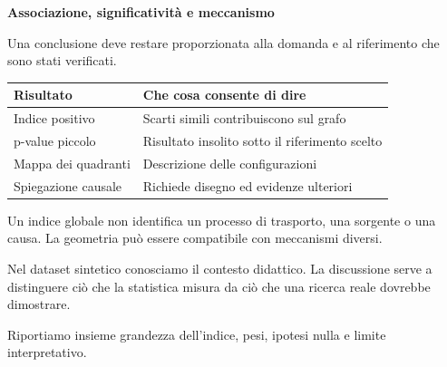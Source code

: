 \documentclass[12pt,aspectratio=1610]{beamer}
\newcommand{\PBody}[1]{\par{\fontsize{11.3}{14.8}\selectfont #1\par}}
\newcommand{\PSmall}[1]{\par{\fontsize{9.8}{13.1}\selectfont #1\par}}
\newcommand{\PInfo}[1]{%
\begin{tcolorbox}[enhanced,arc=1.6mm,boxrule=.55pt,colback=GeoTint,
 colframe=Rule!80!Classical,left=2.3mm,right=2.3mm,top=2mm,bottom=2mm,
 before skip=1mm,after skip=1mm]
\PSmall{#1}\end{tcolorbox}}
\begin{document}
\begin{frame}[plain]\hypertarget{slide69}{}
\begin{lrbox}{\TitleBox}
\begin{minipage}[t]{17.7cm}\raggedright\color{Ink}\fontsize{11.3}{14.8}\selectfont
\color{Navy}\bfseries\fontsize{20.6}{24.5}\selectfont Associazione, significatività e meccanismo
\end{minipage}\end{lrbox}

\begin{lrbox}{\RecallBox}
\begin{minipage}[t]{14.3cm}\raggedright\color{Ink}\fontsize{11.3}{14.8}\selectfont
\fontsize{10.3}{13.8}\selectfont Una conclusione deve restare proporzionata alla domanda e al riferimento che sono stati verificati.
\end{minipage}\end{lrbox}

\begin{lrbox}{\PilotLeftBox}
\begin{minipage}[t]{10.05cm}\raggedright\color{Ink}\fontsize{11.3}{14.8}\selectfont
{\fontsize{10.2}{13.1}\selectfont\renewcommand{\arraystretch}{1.45}\begin{tabular}{@{}p{4.2cm}p{4.8cm}@{}}\toprule
\textbf{Risultato} & \textbf{Che cosa consente di dire}\\\midrule
Indice positivo & Scarti simili contribuiscono sul grafo\\
p-value piccolo & Risultato insolito sotto il riferimento scelto\\
Mappa dei quadranti & Descrizione delle configurazioni\\
Spiegazione causale & Richiede disegno ed evidenze ulteriori\\
\bottomrule\end{tabular}}

\end{minipage}\end{lrbox}

\begin{lrbox}{\PilotRightBox}
\begin{minipage}[t]{7.55cm}\raggedright\color{Ink}\fontsize{11.3}{14.8}\selectfont
\PBody{Un indice globale non identifica un processo di trasporto, una sorgente o una causa. La geometria può essere compatibile con meccanismi diversi.}
\vspace{2.5mm}
\PInfo{Nel dataset sintetico conosciamo il contesto didattico. La discussione serve a distinguere ciò che la statistica misura da ciò che una ricerca reale dovrebbe dimostrare.}
\PBody{Riportiamo insieme grandezza dell’indice, pesi, ipotesi nulla e limite interpretativo.}
\vspace{2.5mm}


\end{minipage}
\end{lrbox}
\end{frame}
\end{document}

